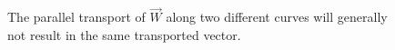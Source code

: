 \documentclass[10pt]{article}
\begin{document}
\begin{figure}[h]
\begin{center}
                    \caption{The parallel transport of $\vec W$ along two different curves will generally not result in the same transported vector.}
    	\end{center}
    \end{figure}
    
%
%                        
%                    
%                    
\end{document}
